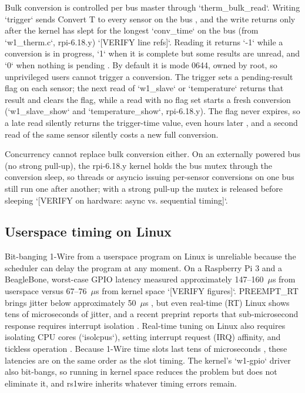 \documentclass[conference]{IEEEtran}
\begin{document}
Bulk conversion is controlled per bus master through `therm\_bulk\_read`.
Writing `trigger` sends Convert T to every sensor on the bus \cite{kernel_w1_therm_docs}, and the write returns only after the kernel has slept for the longest `conv\_time` on the bus (from `w1\_therm.c`, rpi-6.18.y) `[VERIFY line refs]`.
Reading it returns `-1` while a conversion is in progress, `1` when it is complete but some results are unread, and `0` when nothing is pending \cite{kernel_w1_therm_docs, kernel_w1_therm_abi}.
By default it is mode 0644, owned by root, so unprivileged users cannot trigger a conversion.
The trigger sets a pending-result flag on each sensor; the next read of `w1\_slave` or `temperature` returns that result and clears the flag, while a read with no flag set starts a fresh conversion (`w1\_slave\_show` and `temperature\_show`, rpi-6.18.y).
The flag never expires, so a late read silently returns the trigger-time value, even hours later \cite{kernel_w1_therm_abi}, and a second read of the same sensor silently costs a new full conversion.

Concurrency cannot replace bulk conversion either.
On an externally powered bus (no strong pull-up), the rpi-6.18.y kernel holds the bus mutex through the conversion sleep, so threads or asyncio issuing per-sensor conversions on one bus still run one after another; with a strong pull-up the mutex is released before sleeping `[VERIFY on hardware: async vs. sequential timing]`.

\subsection{Userspace timing on Linux}

Bit-banging 1-Wire from a userspace program on Linux is unreliable because the scheduler can delay the program at any moment.
On a Raspberry Pi 3 and a BeagleBone, worst-case GPIO latency measured approximately 147--160~$\mu$s from userspace versus 67--76~$\mu$s from kernel space \cite{adam2021performance} `[VERIFY figures]`.
PREEMPT\_RT brings jitter below approximately 50~$\mu$s \cite{adam2021real}, but even real-time (RT) Linux shows tens of microseconds of jitter, and a recent preprint reports that sub-microsecond response requires interrupt isolation \cite{zhou2025towards}.
Real-time tuning on Linux also requires isolating CPU cores (`isolcpus`), setting interrupt request (IRQ) affinity, and tickless operation \cite{madden2019challenges}.
Because 1-Wire time slots last tens of microseconds \cite{Analog_Devices_1w_software}, these latencies are on the same order as the slot timing.
The kernel's `w1-gpio` driver also bit-bangs, so running in kernel space reduces the problem but does not eliminate it, and rs1wire inherits whatever timing errors remain.
\end{document}
